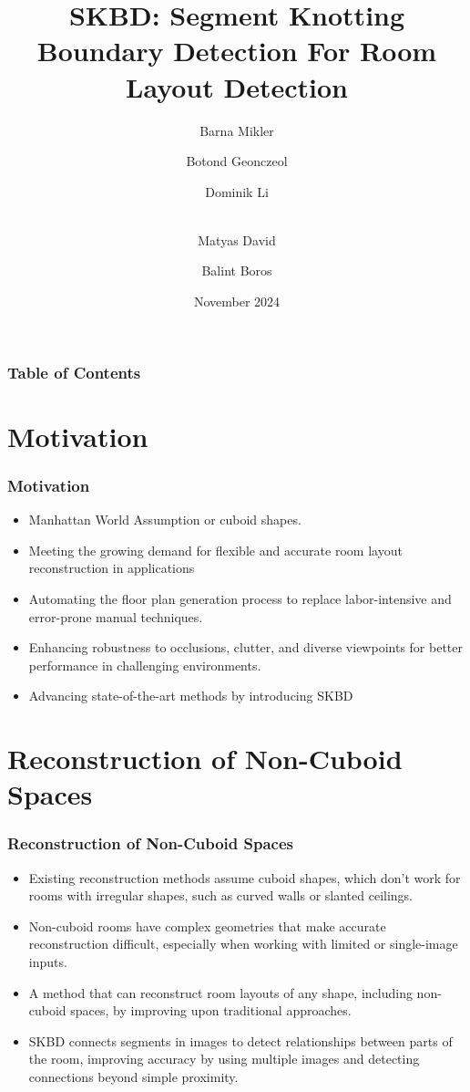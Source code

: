 \documentclass{beamer}
\title[SKBD] {SKBD: Segment Knotting Boundary Detection For Room Layout Detection}
\author[Pictures]
{Barna Mikler \and Botond Geonczeol \and Dominik Li \and \\ Matyas David \and Balint Boros}
\institute[ELTE]{Eötvös Loránd University \\ Faculty of Informatics}
\date[2024] {November 2024}
\begin{document}
\frame{\titlepage}

\begin{frame}
\frametitle{Table of Contents}
\tableofcontents
\end{frame}  

\section{Motivation}
\begin{frame}
\frametitle{Motivation}
\begin{itemize}
    \item Manhattan World Assumption or cuboid shapes.
    \item Meeting the growing demand for flexible and accurate room layout reconstruction in applications
    \item Automating the floor plan generation process to replace labor-intensive and error-prone manual techniques.
    \item Enhancing robustness to occlusions, clutter, and diverse viewpoints for better performance in challenging environments.
    \item Advancing state-of-the-art methods by introducing SKBD
\end{itemize}

\end{frame}

\section{Reconstruction of Non-Cuboid Spaces}
\begin{frame}
\frametitle{Reconstruction of Non-Cuboid Spaces}
\begin{itemize}
\item Existing reconstruction methods assume cuboid shapes, which don’t work for rooms with irregular shapes, such as curved walls or slanted ceilings.
\item Non-cuboid rooms have complex geometries that make accurate reconstruction difficult, especially when working with limited or single-image inputs.
\item A method that can reconstruct room layouts of any shape, including non-cuboid spaces, by improving upon traditional approaches.
\item SKBD connects segments in images to detect relationships between parts of the room, improving accuracy by using multiple images and detecting connections beyond simple proximity.
\end{itemize}
\end{frame}
\end{document}
